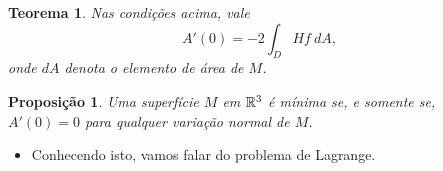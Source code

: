 \documentclass[10pt,a4paper]{beamer}
\newtheorem{teorema}{Teorema}
\newtheorem{proposicao}{Proposição}
\theoremstyle{definition}
\begin{document}
\begin{frame}

	\begin{teorema}
		Nas condições acima, vale
		\begin{equation*}\label{primeira-variacao-da-area}
		A'(0) = -2 \int_D H f\ dA,
		\end{equation*}
		onde $dA$ denota o elemento de área de $M$.
	\end{teorema}

	\pause

	\begin{proposicao}
		\label{superficie-minima-como-ponto-critico-do-funcional-da-area}
		Uma superfície $M$ em $\mathbb R^3$ é \alert{mínima} se, e somente se, $A'(0)=0$ para qualquer variação normal de $M$.
	\end{proposicao}

	\pause
	
	\begin{itemize}
		\item Conhecendo isto, vamos falar do problema de Lagrange.
	\end{itemize}
	

	
\end{frame}
\end{document}
